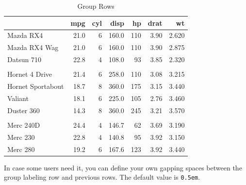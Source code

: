 \documentclass[table]{article}
\newenvironment{Shaded}{\begin{snugshade}}{\end{snugshade}}
\newcommand{\DataTypeTok}[1]{\textcolor[rgb]{0.13,0.29,0.53}{#1}}
\newcommand{\DecValTok}[1]{\textcolor[rgb]{0.00,0.00,0.81}{#1}}
\newcommand{\KeywordTok}[1]{\textcolor[rgb]{0.13,0.29,0.53}{\textbf{#1}}}
\newcommand{\NormalTok}[1]{#1}
\newcommand{\OperatorTok}[1]{\textcolor[rgb]{0.81,0.36,0.00}{\textbf{#1}}}
\newcommand{\StringTok}[1]{\textcolor[rgb]{0.31,0.60,0.02}{#1}}
\begin{document}
\begin{table}[t]

\caption{\label{tab:unnamed-chunk-24}Group Rows}
\centering
\begin{tabular}{lrrrrrr}
\toprule
  & mpg & cyl & disp & hp & drat & wt\\
\midrule
Mazda RX4 & 21.0 & 6 & 160.0 & 110 & 3.90 & 2.620\\
Mazda RX4 Wag & 21.0 & 6 & 160.0 & 110 & 3.90 & 2.875\\
Datsun 710 & 22.8 & 4 & 108.0 & 93 & 3.85 & 2.320\\
\addlinespace[0.3em]
\multicolumn{7}{l}{\textbf{Group 1}}\\
\hspace{1em}Hornet 4 Drive & 21.4 & 6 & 258.0 & 110 & 3.08 & 3.215\\
\hspace{1em}Hornet Sportabout & 18.7 & 8 & 360.0 & 175 & 3.15 & 3.440\\
\hspace{1em}Valiant & 18.1 & 6 & 225.0 & 105 & 2.76 & 3.460\\
\hspace{1em}Duster 360 & 14.3 & 8 & 360.0 & 245 & 3.21 & 3.570\\
\addlinespace[0.3em]
\multicolumn{7}{l}{\textbf{Group 2}}\\
\hspace{1em}Merc 240D & 24.4 & 4 & 146.7 & 62 & 3.69 & 3.190\\
\hspace{1em}Merc 230 & 22.8 & 4 & 140.8 & 95 & 3.92 & 3.150\\
\hspace{1em}Merc 280 & 19.2 & 6 & 167.6 & 123 & 3.92 & 3.440\\
\bottomrule
\end{tabular}
\end{table}

In case some users need it, you can define your own gapping spaces
between the group labeling row and previous rows. The default value is
\texttt{0.5em}.

\begin{Shaded}
\end{Shaded}
\end{document}
